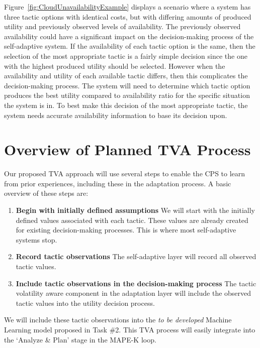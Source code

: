 \documentclass[11pt]{proposalnsf}
\newcommand{\dan}[1]{\textcolor{blue}{{\it [Dan says: #1]}}}
\begin{document}
\begin{sloppypar}

Figure~\ref{fig:CloudUnavailabilityExample} displays a scenario where a system has three tactic options with identical costs, but with differing amounts of produced utility and previously observed levels of availability. The previously observed availability could have a significant impact on the decision-making process of the self-adaptive system. If the availability of each tactic option is the same, then the selection of the most appropriate tactic is a fairly simple decision since the one with the highest produced utility should be selected. However when the availability and utility of each available tactic differs, then this complicates the decision-making process. The system will need to determine which tactic option produces the best utility compared to availability ratio for the specific situation the system is in. To best make this decision of the most appropriate tactic, the system needs accurate availability information to base its decision upon.


\section{Overview of Planned TVA Process} 
Our proposed TVA approach will use several steps to enable the CPS to learn from prior experiences, including these in the adaptation process. A basic overview of these steps are:
\vspace{-2mm}
 \begin{enumerate}[noitemsep]
 	\item \textbf{Begin with initially defined assumptions} We will start with the initially defined values associated with each tactic. These values are already created for existing decision-making processes. This is where most self-adaptive systems stop.
 	\item \textbf{Record tactic observations} The self-adaptive layer will record all observed tactic values.
 	\item \textbf{Include tactic observations in the decision-making process} The tactic volatility aware component in the adaptation layer will include the observed tactic values into the utility decision process.
 \end{enumerate}
\vspace{-1mm}

We will include these tactic observations into the \emph{to be developed} Machine Learning model proposed in Task \#2. This TVA process will easily integrate into the `Analyze \& Plan' stage in the MAPE-K loop.


\end{sloppypar}
\end{document}
